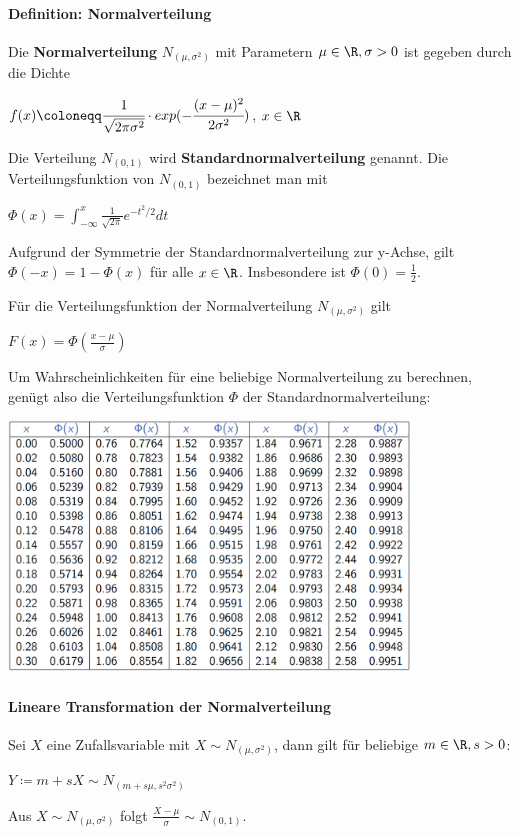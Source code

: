 \paragraph{Definition: Normalverteilung}
Die \textbf{Normalverteilung} $N_{(\mu,\sigma^2)}$ mit Parametern $\mu\in\R,\sigma>0$ ist gegeben durch die Dichte
\begin{tightcenter}
	$f(x)\coloneqq\cfrac{1}{\sqrt{2\pi\sigma^2}}\cdot exp(-\cfrac{(x-\mu)^2}{2\sigma^2})$, \qquad$x\in\R$
\end{tightcenter}
Die Verteilung $N_{(0,1)}$ wird \textbf{Standardnormalverteilung} genannt.
Die Verteilungsfunktion von $N_{(0,1)}$ bezeichnet man mit
\begin{tightcenter}
	$\Phi(x)=\int_{-\infty}^{x}\frac{1}{\sqrt{2\pi}}e^{-t^2/2}dt$
\end{tightcenter}
Aufgrund der Symmetrie der Standardnormalverteilung zur y-Achse, gilt\\ $\Phi(-x)=1-\Phi(x)$ für alle $x\in\R$.
Insbesondere ist $\Phi(0)=\frac{1}{2}$.

Für die Verteilungsfunktion der Normalverteilung $N_{(\mu,\sigma^2)}$ gilt
\begin{tightcenter}
	$F(x)=\Phi(\frac{x-\mu}{\sigma})$
\end{tightcenter}
Um Wahrscheinlichkeiten für eine beliebige Normalverteilung zu berechnen, genügt also die Verteilungsfunktion $\Phi$ der Standardnormalverteilung:
\begin{center}
	\includegraphics[width=0.8\textwidth]{images/image2.png}
\end{center}

\paragraph{Lineare Transformation der Normalverteilung}
Sei $X$ eine Zufallsvariable mit $X\sim N_{(\mu,\sigma^2)}$, dann gilt für beliebige $m\in\R,s>0$:
\begin{tightcenter}
	$Y\coloneqq m+sX\sim N_{(m+s\mu,s^2\sigma^2)}$
\end{tightcenter}
Aus $X\sim N_{(\mu,\sigma^2)}$ folgt $\frac{X-\mu}{\sigma}\sim N_{(0,1)}$.

